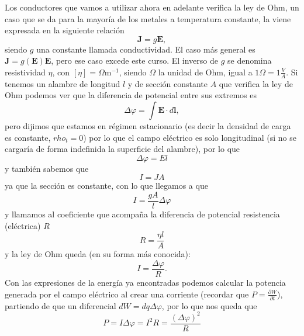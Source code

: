 \documentclass[11pt,a4paper]{article}
\numberwithin{equation}{section}
\begin{document}
Los conductores que vamos a utilizar ahora en adelante verifica la ley de Ohm, un caso que se da para la mayoría de los metales a temperatura constante, la viene expresada en la siguiente relación
\begin{equation}
    \textbf{J} = g \textbf{E},
    \label{eq:corriente_ohm}
\end{equation}
siendo $g$ una constante llamada conductividad. El caso más general es $\textbf{J} = g(\textbf{E}) \textbf{E}$, pero ese caso excede este curso. El inverso de $g$ se denomina resistividad $\eta$, con $[\eta] = \Omega \text{m}^{-1}$, siendo $\Omega$ la unidad de Ohm, igual a $1\Omega = 1 \frac{V}{A}$. Si tenemos un alambre de longitud $l$ y de sección constante $A$ que verifica la ley de Ohm podemos ver que la diferencia de potencial entre sus extremos es \[\Delta \varphi = \int \textbf{E} \cdot d\textbf{l},\] pero dijimos que estamos en régimen estacionario (es decir la densidad de carga es constante, $rho_t = 0$) por lo que el campo eléctrico es solo longitudinal (si no se cargaría de forma indefinida la superficie del alambre), por lo que \[\Delta \varphi = E l\] y también sabemos que \[I = J A\] ya que la sección es constante, con lo que llegamos a que  \[I = \frac{g A}{l} \Delta \varphi\] y llamamos al coeficiente que acompaña la diferencia de potencial resistencia (eléctrica) $R$
\begin{equation}
    R = \frac{\eta l}{A}
    \label{eq:corriente_resistencia}
\end{equation}
y la ley de Ohm queda (en su forma más conocida):
\begin{equation}
    I = \frac{\Delta \varphi}{R}.
    \label{eq:corriente_ohm_tecnica}
\end{equation}
Con las expresiones de la energía ya encontradas podemos calcular la potencia generada por el campo eléctrico al crear una corriente (recordar que $P = \frac{\partial W}{\partial t}$), partiendo de que un diferencial $dW = dq \Delta \varphi$, por lo que nos queda que
\begin{equation}
    P = I \Delta \varphi = I^2 R = \frac{(\Delta \varphi)^2}{R}
    \label{eq:corriente_potencia}
\end{equation}
\end{document}
